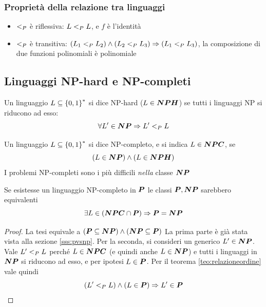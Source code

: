 \subsubsection{Proprietà della relazione tra linguaggi}
\begin{itemize}
    \item $<_P$ è riflessiva: $L <_P L$, e $f$ è l'identità
    \item $<_P$ è transitiva: $(L_1 <_P L_2) \wedge (L_2 <_P L_3) \Rightarrow (L_1 <_P L_3)$, la composizione di due funzioni polinomiali è polinomiale
\end{itemize}

\subsection{Linguaggi NP-hard e NP-completi}

\begin{definition}[NP-hard]
    \label{def:nphard}
    Un linguaggio $L \subseteq \left\{0,1\right\}^{*}$ si dice NP-hard ($L \in \bm{NPH}$) se tutti i linguaggi NP si riducono ad esso:
    \begin{equation*}
        \forall L' \in \bm{NP} \Rightarrow  L' <_P L
    \end{equation*}
\end{definition}

\begin{definition}[NP-completo]
    \label{def:npcompleto}
    Un linguaggio $L \subseteq \left\{0,1\right\}^{*}$ si dice NP-completo, e si indica $L \in \bm{NPC}$, se
    \begin{equation*}
        \left( 
        L \in \bm{NP} 
        \right)
        \wedge
        \left( 
        L \in \bm{NPH}
        \right)
    \end{equation*}
    I problemi NP-completi sono i più difficili \emph{nella} classe $\bm{NP}$
\end{definition}

\begin{corollario}[P=NP]
    Se esistesse un linguaggio NP-completo in $\bm{P}$ le classi $\bm{P}, \bm{NP}$ sarebbero equivalenti
    \begin{equation*}
        \exists L \in \left( \bm{NPC} \cap \bm{P} \right)
        \Rightarrow
        \bm{P} = \bm{NP}
    \end{equation*}
\end{corollario}
\begin{proof}
    La tesi equivale a $ ( \bm{P} \subseteq \bm{NP} ) \wedge ( \bm{NP} \subseteq \bm{P} )$
    La prima parte è già stata vista alla sezione \ref{sss:pvsnp}. Per la seconda, si consideri un generico $L' \in \bm{NP}$. Vale $L' <_P L$ perché $L \in \bm{NPC}$ (e quindi anche $L \in \bm{NP}$) e tutti i linguaggi in $\bm{NP}$ si riducono ad esso, e per ipotesi $L \in \bm{P}$. Per il teorema \ref{teo:relazioneordine} vale quindi
    \begin{equation*}
        \left( L' <_P L \right) \wedge \left( L \in \bm{P} \right) \Rightarrow   L' \in \bm{P} 
    \end{equation*}
\end{proof}

